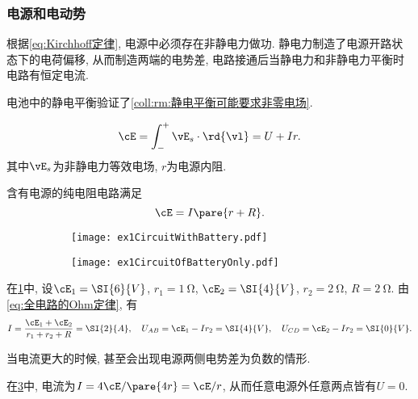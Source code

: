 \documentclass[../Electromagnetism.tex]{subfiles}
\begin{document}

\subsubsection{电源和电动势} %
\label{ssub:电源和电动势}

根据\eqref{eq:Kirchhoff定律}, 电源中必须存在非静电力做功. 静电力制造了电源开路状态下的电荷偏移, 从而制造两端的电势差, 电路接通后当静电力和非静电力平衡时电路有恒定电流.
\begin{remark}
	电池中的静电平衡验证了\cref{coll:rm:静电平衡可能要求非零电场}.
\end{remark}
\begin{finale}
	\begin{corollary}[含电源电路的Ohm定律]\quad
		\[ \cE = \int_-^+ \vE_s\cdot\rd{\vl} = U + Ir. \]
		其中$\vE_s$为非静电力等效电场, $r$为电源内阻.
	\end{corollary}
\end{finale}
\begin{corollary}[全电路的Ohm定律]
	含有电源的纯电阻电路满足
	\begin{equation}
		\label{eq:全电路的Ohm定律}
		\cE = I\pare{r+R}.
	\end{equation}
\end{corollary}
\begin{figure}
	\centering
	\begin{subfigure}{.45\textwidth}
		\centering
			\texttt{[image: ex1CircuitWithBattery.pdf]}
		\caption{}
		\label{fig:含电源电路示例1}
	\end{subfigure}
	\begin{subfigure}{.45\textwidth}
		\centering
			\texttt{[image: ex1CircuitOfBatteryOnly.pdf]}
		\caption{}
		\label{fig:纯电源电路示例1}
	\end{subfigure}
\end{figure}
\begin{ex}
	在\cref{fig:含电源电路示例1}中, 设$\cE_1 = \SI{6}{V}$, $r_1 = \SI{1}{\ohm}$, $\cE_2 = \SI{4}{V}$, $r_2 = \SI{2}{\ohm}$, $R = \SI{2}{\ohm}$. 由\eqref{eq:全电路的Ohm定律}, 有
	\[ I = \frac{\cE_1 + \cE_2}{r_1 + r_2 + R} = \SI{2}{A},\quad U_{AB} = \cE_1 - Ir_2 = \SI{4}{V},\quad U_{CD} = \cE_2 - Ir_2 = \SI{0}{V}. \]
\end{ex}
\begin{remark}
	当电流更大的时候, 甚至会出现电源两侧电势差为负数的情形.
\end{remark}
\begin{ex}
	在\cref{fig:纯电源电路示例1}中, 电流为$I = 4\cE/\pare{4r} = \cE/r$, 从而任意电源外任意两点皆有$U = 0$.
\end{ex}
\end{document}
